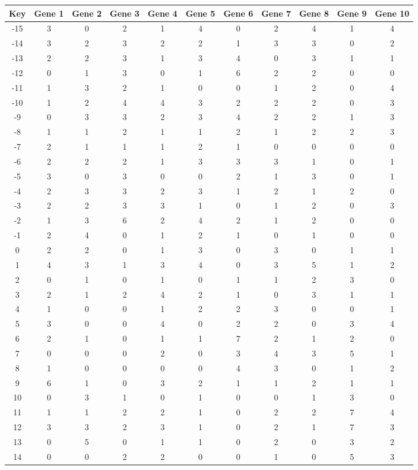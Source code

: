 \begin{tabular}{|c|c|c|c|c|c|c|c|c|c|c|}
\hline
Key & Gene 1 & Gene 2 & Gene 3 & Gene 4 & Gene 5 & Gene 6 & Gene 7 & Gene 8 & Gene 9 & Gene 10 \\
\hline
-15 & 3 & 0 & 2 & 1 & 4 & 0 & 2 & 4 & 1 & 4 \\
-14 & 3 & 2 & 3 & 2 & 2 & 1 & 3 & 3 & 0 & 2 \\
-13 & 2 & 2 & 3 & 1 & 3 & 4 & 0 & 3 & 1 & 1 \\
-12 & 0 & 1 & 3 & 0 & 1 & 6 & 2 & 2 & 0 & 0 \\
-11 & 1 & 3 & 2 & 1 & 0 & 0 & 1 & 2 & 0 & 4 \\
-10 & 1 & 2 & 4 & 4 & 3 & 2 & 2 & 2 & 0 & 3 \\
-9 & 0 & 3 & 3 & 2 & 3 & 4 & 2 & 2 & 1 & 3 \\
-8 & 1 & 1 & 2 & 1 & 1 & 2 & 1 & 2 & 2 & 3 \\
-7 & 2 & 1 & 1 & 1 & 2 & 1 & 0 & 0 & 0 & 0 \\
-6 & 2 & 2 & 2 & 1 & 3 & 3 & 3 & 1 & 0 & 1 \\
-5 & 3 & 0 & 3 & 0 & 0 & 2 & 1 & 3 & 0 & 1 \\
-4 & 2 & 3 & 3 & 2 & 3 & 1 & 2 & 1 & 2 & 0 \\
-3 & 2 & 2 & 3 & 3 & 1 & 0 & 1 & 2 & 0 & 3 \\
-2 & 1 & 3 & 6 & 2 & 4 & 2 & 1 & 2 & 0 & 0 \\
-1 & 2 & 4 & 0 & 1 & 2 & 1 & 0 & 1 & 0 & 0 \\
0 & 2 & 2 & 0 & 1 & 3 & 0 & 3 & 0 & 1 & 1 \\
1 & 4 & 3 & 1 & 3 & 4 & 0 & 3 & 5 & 1 & 2 \\
2 & 0 & 1 & 0 & 1 & 0 & 1 & 1 & 2 & 3 & 0 \\
3 & 2 & 1 & 2 & 4 & 2 & 1 & 0 & 3 & 1 & 1 \\
4 & 1 & 0 & 0 & 1 & 2 & 2 & 3 & 0 & 0 & 1 \\
5 & 3 & 0 & 0 & 4 & 0 & 2 & 2 & 0 & 3 & 4 \\
6 & 2 & 1 & 0 & 1 & 1 & 7 & 2 & 1 & 2 & 0 \\
7 & 0 & 0 & 0 & 2 & 0 & 3 & 4 & 3 & 5 & 1 \\
8 & 1 & 0 & 0 & 0 & 0 & 4 & 3 & 0 & 1 & 2 \\
9 & 6 & 1 & 0 & 3 & 2 & 1 & 1 & 2 & 1 & 1 \\
10 & 0 & 3 & 1 & 0 & 1 & 0 & 0 & 1 & 3 & 0 \\
11 & 1 & 1 & 2 & 2 & 1 & 0 & 2 & 2 & 7 & 4 \\
12 & 3 & 3 & 2 & 3 & 1 & 0 & 2 & 1 & 7 & 3 \\
13 & 0 & 5 & 0 & 1 & 1 & 0 & 2 & 0 & 3 & 2 \\
14 & 0 & 0 & 2 & 2 & 0 & 0 & 1 & 0 & 5 & 3 \\
\hline
\end{tabular}